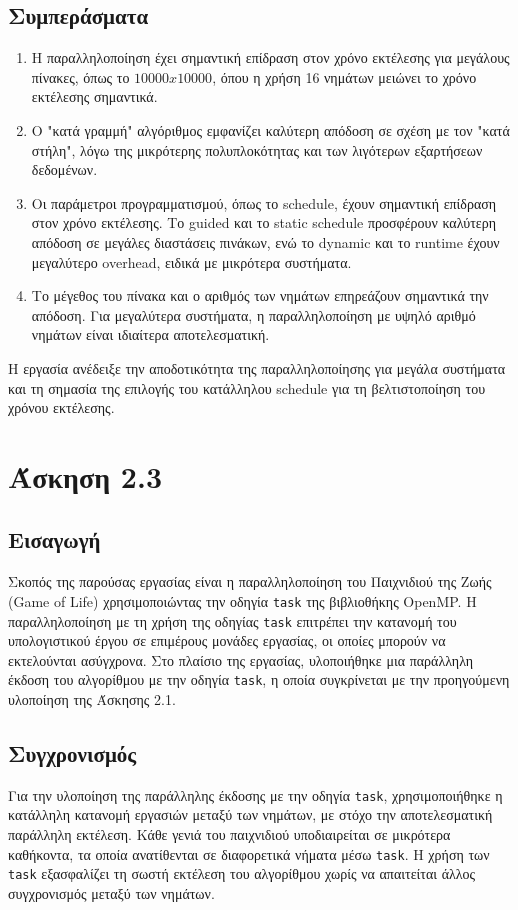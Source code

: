 \documentclass{article}
\begin{document}
\subsection*{Συμπεράσματα} 
\begin{enumerate} 
    \item Η παραλληλοποίηση έχει σημαντική επίδραση στον χρόνο εκτέλεσης για μεγάλους πίνακες, όπως το $10000x10000$, όπου η χρήση 16 νημάτων μειώνει το χρόνο εκτέλεσης σημαντικά.
    \item Ο "κατά γραμμή" αλγόριθμος εμφανίζει καλύτερη απόδοση σε σχέση με τον "κατά στήλη", λόγω της μικρότερης πολυπλοκότητας και των λιγότερων εξαρτήσεων δεδομένων.
    \item Οι παράμετροι προγραμματισμού, όπως το schedule, έχουν σημαντική επίδραση στον χρόνο εκτέλεσης. Το guided και το static schedule προσφέρουν καλύτερη απόδοση σε μεγάλες διαστάσεις πινάκων, ενώ το dynamic και το runtime έχουν μεγαλύτερο overhead, ειδικά με μικρότερα συστήματα.
    \item Το μέγεθος του πίνακα και ο αριθμός των νημάτων επηρεάζουν σημαντικά την απόδοση. Για μεγαλύτερα συστήματα, η παραλληλοποίηση με υψηλό αριθμό νημάτων είναι ιδιαίτερα αποτελεσματική.
\end{enumerate} 
Η εργασία ανέδειξε την αποδοτικότητα της παραλληλοποίησης για μεγάλα συστήματα και τη σημασία της επιλογής του κατάλληλου schedule για τη βελτιστοποίηση του χρόνου εκτέλεσης.
\section*{Άσκηση 2.3} 
\subsection*{Εισαγωγή} Σκοπός της παρούσας εργασίας είναι η παραλληλοποίηση του Παιχνιδιού της Ζωής (Game of Life) χρησιμοποιώντας την οδηγία \texttt{task} της βιβλιοθήκης OpenMP. Η παραλληλοποίηση με τη χρήση της οδηγίας \texttt{task} επιτρέπει την κατανομή του υπολογιστικού έργου σε επιμέρους μονάδες εργασίας, οι οποίες μπορούν να εκτελούνται ασύγχρονα. Στο πλαίσιο της εργασίας, υλοποιήθηκε μια παράλληλη έκδοση του αλγορίθμου με την οδηγία \texttt{task}, η οποία συγκρίνεται με την προηγούμενη υλοποίηση της Άσκησης 2.1.
\subsection*{Συγχρονισμός} Για την υλοποίηση της παράλληλης έκδοσης με την οδηγία \texttt{task}, χρησιμοποιήθηκε η κατάλληλη κατανομή εργασιών μεταξύ των νημάτων, με στόχο την αποτελεσματική παράλληλη εκτέλεση. Κάθε γενιά του παιχνιδιού υποδιαιρείται σε μικρότερα καθήκοντα, τα οποία ανατίθενται σε διαφορετικά νήματα μέσω \texttt{task}. Η χρήση των \texttt{task} εξασφαλίζει τη σωστή εκτέλεση του αλγορίθμου χωρίς να απαιτείται άλλος συγχρονισμός μεταξύ των νημάτων.
\end{document}
